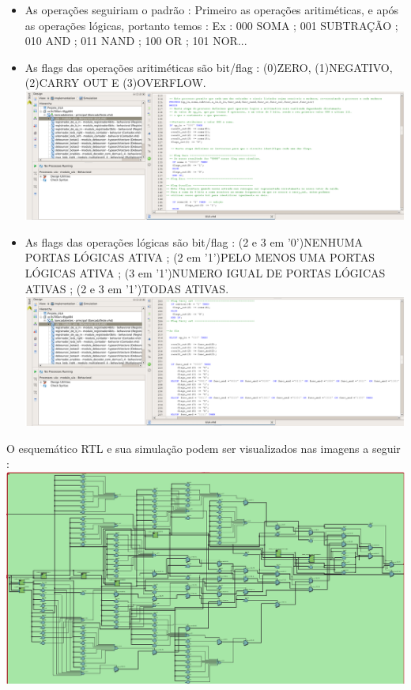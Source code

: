 \documentclass[11pt]{book}
\begin{document}
\begin{itemize}
\newline
    \item As operações seguiriam o padrão : Primeiro as operações aritiméticas, e após as operações lógicas, portanto temos : Ex : 000 SOMA ; 001 SUBTRAÇÃO ; 010 AND ; 011 NAND ; 100 OR ; 101 NOR...
    \item As flags das operações aritiméticas são bit/flag : (0)ZERO, (1)NEGATIVO, (2)CARRY OUT E (3)OVERFLOW.
    \newline\newline
    \includegraphics[width=1.1\textwidth]{flagss.png}
    \newline
    \item As flags das operações lógicas são bit/flag : (2 e 3 em '0')NENHUMA PORTAS LÓGICAS ATIVA ; (2 em '1')PELO MENOS UMA PORTAS LÓGICAS ATIVA ; (3 em '1')NUMERO IGUAL DE PORTAS LÓGICAS ATIVAS ; (2 e 3 em '1')TODAS ATIVAS.
    \newline\newline
    \includegraphics[width=1.1\textwidth]{flags.png}
    \newline
\end{itemize}
O esquemático RTL e sua simulação podem ser visualizados nas imagens a seguir :
\newline
\newline
\includegraphics[width=1.1\textwidth]{Simulacao_RTL.png}%
\end{document}
